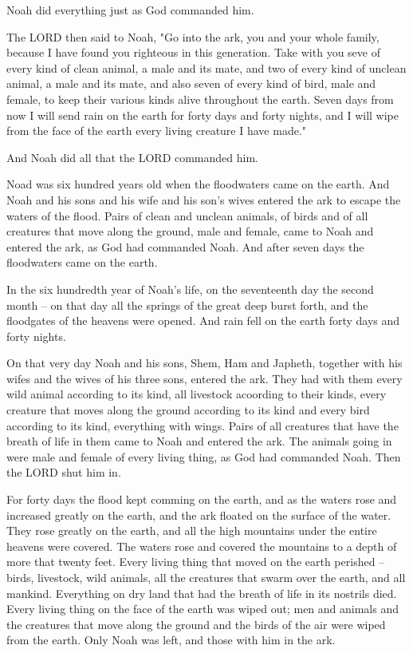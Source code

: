 \V Noah did everything just as God commanded him.

\C The LORD then said to Noah, "Go into the ark, you and your whole family,
because I have found you righteous in this generation. \V Take with you seve of
every kind of clean animal, a male and its mate, and two of every kind of
unclean animal, a male and its mate, \V and also seven of every kind of bird,
male and female, to keep their various kinds alive throughout the earth. \V
Seven days from now I will send rain on the earth for forty days and forty
nights, and I will wipe from the face of the earth every living creature I have
made."

\V And Noah did all that the LORD commanded him.

\V Noad was six hundred years old when the floodwaters came on the earth. \V And
Noah and his sons and his wife and his son's wives entered the ark to escape the
waters of the flood. \V Pairs of clean and unclean animals, of birds and of all
creatures that move along the ground, \V male and female, came to Noah and
entered the ark, as God had commanded Noah. \V And after seven days the
floodwaters came on the earth.

\V In the six hundredth year of Noah's life, on the seventeenth day the second
month -- on that day all the springs of the great deep burst forth, and the
floodgates of the heavens were opened. \V And rain fell on the earth forty days
and forty nights.

\V On that very day Noah and his sons, Shem, Ham and Japheth, together with his
wifes and the wives of his three sons, entered the ark. \V They had with them
every wild animal according to its kind, all livestock acoording to their kinds,
every creature that moves along the ground according to its kind and every bird
according to its kind, everything with wings. \V Pairs of all creatures that
have the breath of life in them came to Noah and entered the ark. \V The animals
going in were male and female of every living thing, as God had commanded Noah.
Then the LORD shut him in.

\V For forty days the flood kept comming on the earth, and as the waters rose
and increased greatly on the earth, and the ark floated on the surface of the
water. \V They rose greatly on the earth, and all the high mountains under the
entire heavens were covered. \V The waters rose and covered the mountains to a
depth of more that twenty feet. \V Every living thing that moved on the earth
perished -- birds, livestock, wild animals, all the creatures that swarm over
the earth, and all mankind. \V Everything on dry land that had the breath of
life in its nostrils died. \V Every living thing on the face of the earth was
wiped out; men and animals and the creatures that move along the ground and the
birds of the air were wiped from the earth. Only Noah was left, and those with
him in the ark.

